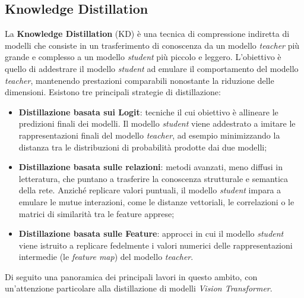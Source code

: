 \subsection{Knowledge Distillation}
La \textbf{Knowledge Distillation} (KD) è una tecnica di compressione indiretta
di modelli che consiste in un trasferimento di conoscenza da un modello
\textit{teacher} più grande e complesso a un modello \textit{student} più
piccolo e leggero. L'obiettivo è quello di addestrare il modello
\textit{student} ad emulare il comportamento del modello \textit{teacher},
mantenendo prestazioni comparabili nonostante la riduzione delle dimensioni.
Esistono tre principali strategie di distillazione:
\begin{itemize}
    \item \textbf{Distillazione basata sui Logit}: tecniche il cui obiettivo è allineare le predizioni finali dei modelli. Il modello \textit{student} viene addestrato a imitare le rappresentazioni finali del modello \textit{teacher}, ad esempio minimizzando la distanza tra le distribuzioni di probabilità prodotte dai due modelli;
    \item \textbf{Distillazione basata sulle relazioni}: metodi avanzati, meno diffusi in letteratura, che puntano a trasferire la conoscenza strutturale e semantica della rete. Anziché replicare valori puntuali, il modello \textit{student} impara a emulare le mutue interazioni, come le distanze vettoriali, le correlazioni o le matrici di similarità tra le feature apprese;
    \item \textbf{Distillazione basata sulle Feature}: approcci in cui il modello \textit{student} viene istruito a replicare fedelmente i valori numerici delle rappresentazioni intermedie (le \textit{feature map}) del modello \textit{teacher}.
\end{itemize}
Di seguito una panoramica dei principali lavori in questo ambito, con un'attenzione particolare alla distillazione di modelli \textit{Vision Transformer}.

